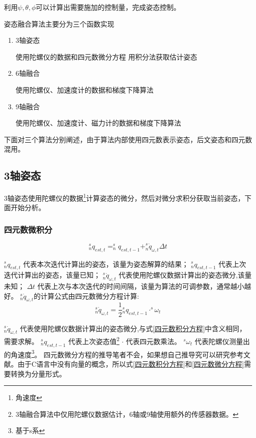 \documentclass[12pt,a4paper]{article}
\renewcommand{\citet}[1]{\textsuperscript{\cite{#1}}}
\begin{document}
利用$\psi,\theta,\phi$可以计算出需要施加的控制量，完成姿态控制。

姿态融合算法主要分为三个函数实现
\begin{enumerate}
    \item 3轴姿态

        使用陀螺仪的数据和四元数微分方程 用积分法获取估计姿态
    \item 6轴融合

        使用陀螺仪、加速度计的数据和梯度下降算法
    \item 9轴融合

        使用陀螺仪、加速度计、磁力计的数据和梯度下降算法
\end{enumerate}

下面对三个算法分别阐述，由于算法内部使用四元数表示姿态，后文姿态和四元数混用。

\subsection{3轴姿态}
3轴姿态使用陀螺仪的数据\footnote{角速度}计算姿态的微分，然后对微分求积分获取当前姿态，下面开始分析。
\subsubsection{四元数微积分}
\begin{equation}\label{四元数积分方程}
    ^s_nq_{est,t}=^s_nq_{est,t-1}+^s_n\dot{q}_{\omega,t}\Delta t
\end{equation} 

$^s_nq_{est,t}$          代表本次迭代计算出的姿态，该量为姿态解算的结果；
$^s_nq_{est,t-1}$        代表上次迭代计算出的姿态，该量已知；
$^s_n\dot{q}_{\omega,t}$ 代表使用陀螺仪数据计算出的姿态微分,该量未知；
$\Delta t$               代表上次与本次迭代的时间间隔，该量为算法的可调参数，通常越小越好。
$^s_n\dot{q}_{\omega,t}$的计算公式由四元数微分方程计算:
\begin{equation}\label{四元数微分方程}
    ^s_n\dot{q}_{\omega,t}=\frac{1}{2}{^s_nq_{est,t-1}}\cdot^s\omega_t
\end{equation} 

$^s_n\dot{q}_{\omega,t}$ 代表使用陀螺仪数据计算出的姿态微分,与式\ref{四元数积分方程}中含义相同，需要求解。
$^s_nq_{est,t-1}$  代表上次姿态值\footnote{3轴融合算法中仅用陀螺仪数据估计，6轴或9轴使用额外的传感器数据。}
$\cdot$                  代表四元数乘法。
$^s\omega_t$             代表陀螺仪测量出的角速度\footnote{基于s系}。
四元数微分方程的推导笔者不会，如果想自己推导究可以研究参考文献\citet{四元数微分方程的推导}。由于C语言中没有向量的概念，所以式\ref{四元数积分方程}和\ref{四元数微分方程}需要转换为分量形式。
\end{document}
